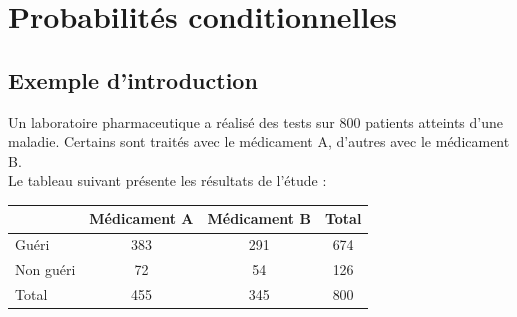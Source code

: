\documentclass[a4paper,11pt,cours]{nsi} %
\begin{document}
\setcounter{chapter}{3} %

\chapter{Probabilités conditionnelles}



\setlength{\columnseprule}{0.5pt}
\setlength{\columnsep}{1cm}


\section{Exemple d'introduction}
Un laboratoire pharmaceutique a réalisé des tests sur 800 patients atteints d'une maladie. Certains sont traités avec le médicament A, d'autres avec le médicament B.\\
Le tableau suivant présente les résultats de l'étude :
\begin{center}
	\begin{tabular}{|l|c|c|c|}
		\hline
		& Médicament A & Médicament B & Total\\
		\hline
		Guéri & 383 & 291 & 674\\
		\hline
		Non guéri & 72 & 54 & 126\\
		\hline
		Total & 455 & 345 & 800\\
		\hline
	\end{tabular}
\end{center}
\end{document}
